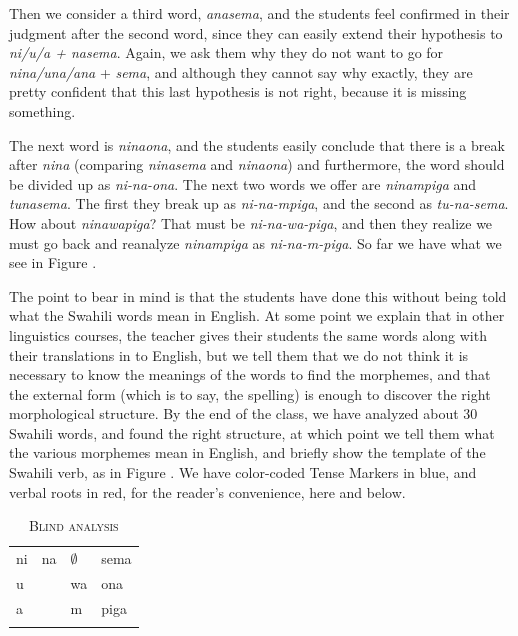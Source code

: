 \documentclass[output=paper,colorlinks,citecolor=brown,
]{langscibook}
\newcommand{\SM}{{\color{red}SM}}
\begin{document}
Then we consider a third word, \textit{anasema}, and the students feel confirmed in their judgment after the second word, since they can easily extend their hypothesis to \textit{ni/u/a + nasema}. Again, we ask them why they do not want to go for \textit{nina/una/ana} + \textit{sema}, and although they cannot say why exactly, they are pretty confident that this last hypothesis is not right, because it is missing something. 

The next word is \textit{ninaona}, and the students easily conclude that there is a break after \textit{nina} (comparing \textit{ninasema} and \textit{ninaona}) and furthermore, the word should be divided up as \textit{ni-na-ona}. The next two words we offer are \textit{ninampiga} and \textit{tunasema}. The first they break up as \textit{ni-na-mpiga}, and the second as \textit{tu-na-sema}. How about \textit{ninawapiga}? That must be \textit{ni-na-wa-piga}, and then they realize we must go back and reanalyze \textit{ninampiga} as \textit{ni-na-m-piga}. So far we have what we see in Figure .

The point to bear in mind is that the students have done this without being told what the Swahili words mean in English. At some point we explain that in other linguistics courses, the teacher gives their students the same words along with their translations in to English, but we tell them that we do not think it is necessary to know the meanings of the words to find the morphemes, and that the external form (which is to say, the spelling) is enough to discover the right morphological structure. By the end of the class, we have analyzed about 30 Swahili words, and found the right structure, at which point we tell them what the various morphemes mean in English, and briefly show the template of the Swahili verb, as in Figure . We have color-coded Tense Markers in blue, and verbal roots in red, for the reader's convenience, here and below\todo{Color \SM}. 



\begin{table}
\begin{tabular}{llll} \lsptoprule
ni & na & $\emptyset$ & sema \\
u &     & wa & ona \\
a &     & m  & piga \\ \lspbottomrule
\end{tabular}
\caption{\textsc{Blind analysis}}
\label{blind-analysis}
\end{table}
\end{document}
